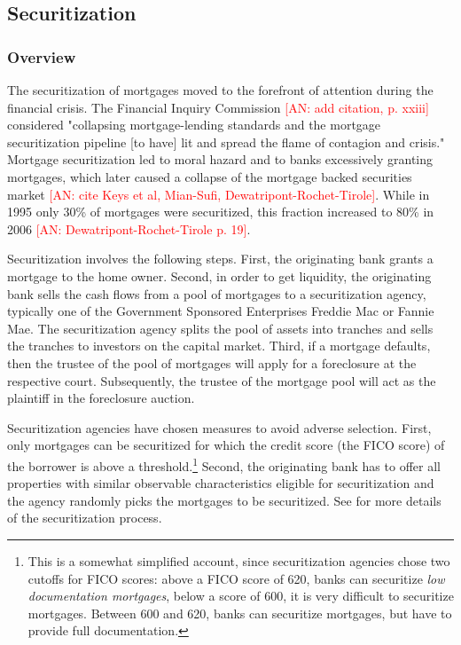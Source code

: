 \documentclass[11pt,twopage]{article}
\newcommand{\AN}[1]{\textcolor{red}{[AN: #1]}}
\begin{document}
\subsection{Securitization}
\label{sec:securitization}

\subsubsection{Overview}

The securitization of mortgages moved to the forefront of attention during the financial crisis. The Financial Inquiry Commission 
\AN{add citation, p. xxiii} considered "collapsing mortgage-lending standards and the mortgage securitization pipeline [to have] lit and spread the flame of contagion and crisis." Mortgage securitization led to moral hazard and to banks excessively granting mortgages, which later caused a collapse of the mortgage backed securities market \AN{cite Keys et al, Mian-Sufi, Dewatripont-Rochet-Tirole}. While in 1995 only 30\% of mortgages were securitized, this fraction increased to 80\% in 2006 \AN{Dewatripont-Rochet-Tirole p. 19}.

Securitization involves the following steps. First, the
originating bank grants a mortgage to the home owner. Second, in order to get
liquidity, the originating bank sells the cash flows from a pool of
mortgages to a securitization agency, typically one of the Government
Sponsored Enterprises Freddie Mac or Fannie Mae. The securitization
agency splits the pool of assets into tranches and sells the tranches
to investors on the capital market. Third, if a mortgage defaults, then the trustee of the pool of mortgages will apply for a foreclosure at the respective court. Subsequently, the trustee of the mortgage pool will act as the plaintiff in the foreclosure auction.

Securitization agencies
have chosen measures to avoid adverse selection. First,
only mortgages can be securitized for which the credit score (the FICO score) of the borrower is above a threshold.\footnote{This is a somewhat simplified account,
	since securitization agencies chose two cutoffs for FICO scores:
	above a FICO score of 620, banks can securitize \emph{low
		documentation mortgages}, below a score of 600, it is very
	difficult to securitize mortgages. Between 600 and 620, banks can
	securitize mortgages, but have to provide full documentation.}
Second, the originating bank has to offer all properties with similar observable characteristics eligible for securitization and the agency
randomly picks the mortgages to be securitized. See \cite{keys2008did} for more details of the securitization process.
\end{document}
